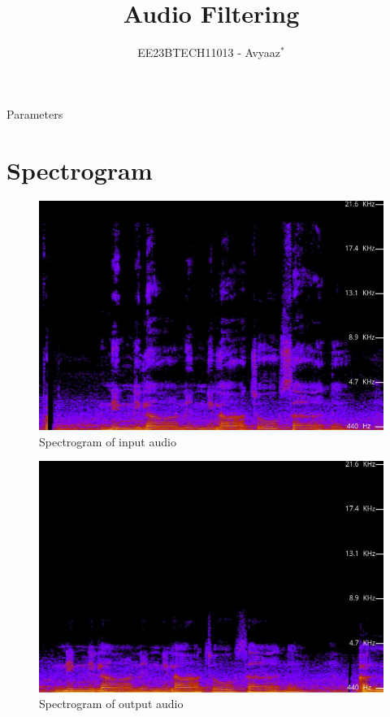 \documentclass[journal,12pt,twocolumn]{IEEEtran}
\theoremstyle{remark}
\begin{document}

\vspace{3cm}

\title{Audio Filtering}
\author{EE23BTECH11013 - Avyaaz$^{*}$%
}
\maketitle
\newpage
\bigskip

\renewcommand{\thefigure}{\arabic{figure}}
\renewcommand{\thetable}{\arabic{table}}


\begin{table}[htbp]
\centering
 
 \caption{Parameters}
\label{tab:parameters}
\end{table}
\section{Spectrogram}
\begin{figure}[!h] 
\centering
\includegraphics[width=\columnwidth]{figs/Input_audio_signal.jpg}
\caption{Spectrogram of input audio}
\end{figure}

\begin{figure}[!h] 
\centering
\includegraphics[width=\columnwidth]{figs/Output_audio_signal.jpg}
\caption{Spectrogram of output audio}
\end{figure}
\end{document}
